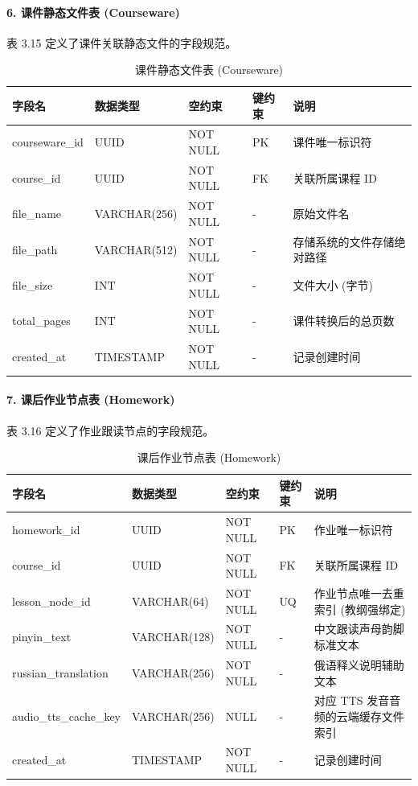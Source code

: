 \paragraph{6. 课件静态文件表 (Courseware)}
表 3.15 定义了课件关联静态文件的字段规范。
\begin{table}[H]
\centering
\caption{课件静态文件表 (Courseware)}
\begin{tabularx}{\textwidth}{l p{3.2cm} p{1.8cm} p{1.8cm} X}
\toprule
\textbf{字段名} & \textbf{数据类型} & \textbf{空约束} & \textbf{键约束} & \textbf{说明} \\
\midrule
courseware\_id & UUID & NOT NULL & PK & 课件唯一标识符 \\
course\_id & UUID & NOT NULL & FK & 关联所属课程 ID \\
file\_name & VARCHAR(256) & NOT NULL & - & 原始文件名 \\
file\_path & VARCHAR(512) & NOT NULL & - & 存储系统的文件存储绝对路径 \\
file\_size & INT & NOT NULL & - & 文件大小 (字节) \\
total\_pages & INT & NOT NULL & - & 课件转换后的总页数 \\
created\_at & TIMESTAMP & NOT NULL & - & 记录创建时间 \\
\bottomrule
\end{tabularx}
\end{table}

\paragraph{7. 课后作业节点表 (Homework)}
表 3.16 定义了作业跟读节点的字段规范。
\begin{table}[H]
\centering
\caption{课后作业节点表 (Homework)}
\begin{tabularx}{\textwidth}{l p{3.2cm} p{1.8cm} p{1.8cm} X}
\toprule
\textbf{字段名} & \textbf{数据类型} & \textbf{空约束} & \textbf{键约束} & \textbf{说明} \\
\midrule
homework\_id & UUID & NOT NULL & PK & 作业唯一标识符 \\
course\_id & UUID & NOT NULL & FK & 关联所属课程 ID \\
lesson\_node\_id & VARCHAR(64) & NOT NULL & UQ & 作业节点唯一去重索引 (教纲强绑定) \\
pinyin\_text & VARCHAR(128) & NOT NULL & - & 中文跟读声母韵脚标准文本 \\
russian\_translation & VARCHAR(256) & NOT NULL & - & 俄语释义说明辅助文本 \\
audio\_tts\_cache\_key & VARCHAR(256) & NULL & - & 对应 TTS 发音音频的云端缓存文件索引 \\
created\_at & TIMESTAMP & NOT NULL & - & 记录创建时间 \\
\bottomrule
\end{tabularx}
\end{table}

